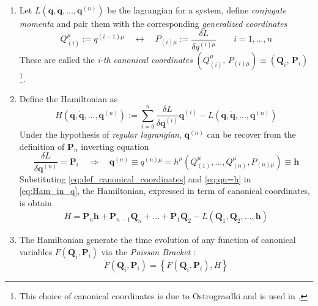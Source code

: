 \begin{enumerate}
  \item Let $L(\bm{q}, \dot{\bm{q}}, \ldots, \bm{q}^{(n)})$ be the lagrangian
    for a system, define \emph{conjugate momenta} and pair them with the
    corresponding \emph{generalized coordinates}
    \begin{equation} \label{eq:def_canonical_coordinates}
      Q_{(i)}^{\mu} := q^{(i-1)\mu}
      \quad \leftrightarrow \quad
      P_{(i)\mu} := \frac{\delta L}{\delta q^{(i)\mu}}
      \qquad i = 1, \ldots, n
    \end{equation}
    These are called the \emph{i-th canonical coordinates}
    $(Q_{(i)}^{\mu}, \, P_{(i)\mu}) \equiv (\bm{Q}_{i}, \, \bm{P}_{i})$
    \footnote{
      This choice of canonical coordinates is due to Ostrograsdki and is used
      in \cite{Smilga17, Chen13}.
    }.

  \item Define the Hamiltonian as
    \begin{equation} \label{eq:Ham_in_q}
      H(\bm{q}, \dot{\bm{q}}, \ldots, \bm{q}^{(n)}) :=
      \sum_{i=0}^{n} \frac{\delta L}{\delta \bm{q}^{(i)}} \bm{q}^{(i)} -
      L(\bm{q}, \dot{\bm{q}}, \ldots, \bm{q}^{(n)})
    \end{equation}
    Under the hypothesis of \emph{regular lagrangian}, $\bm{q}^{(n)}$ can be
    recover from the definition of $\bm{P}_n$ inverting equation
    \begin{equation} \label{eq:qn=h}
      \frac{\delta L}{\delta \bm{q}^{(n)}} = \bm{P}_i
      \quad \Rightarrow \quad
      \bm{q}^{(n)} \equiv q^{(n)\mu} =
      h^{\mu}(Q^{\mu}_{(1)}, \ldots, Q^{\mu}_{(n)}, P_{(n)\mu}) \equiv \bm{h}
    \end{equation}
    Substituting \eqref{eq:def_canonical_coordinates} and \eqref{eq:qn=h} in
    \eqref{eq:Ham_in_q}, the Hamiltonian, expressed in term of canonical
    coordinates, is obtain
    \begin{align}
      H = \bm{P}_n \bm{h} + \bm{P}_{n-1} \bm{Q}_n + \ldots + \bm{P}_1 \bm{Q}_2
          - L(\bm{Q}_1, \bm{Q}_2, \ldots, \bm{h})
    \end{align}

  \item The Hamiltonian generate the time evolution of any function of canonical
    variables $F(\bm{Q}_i, \bm{P}_i)$ via the \emph{Poisson Bracket}
    \cite{Chen13}:
    \begin{equation}
      \dot{F}(\bm{Q}_i, \bm{P}_i) = \left\{
        F(\bm{Q}_i, \bm{P}_i), H
      \right\}
    \end{equation}


\end{enumerate}
